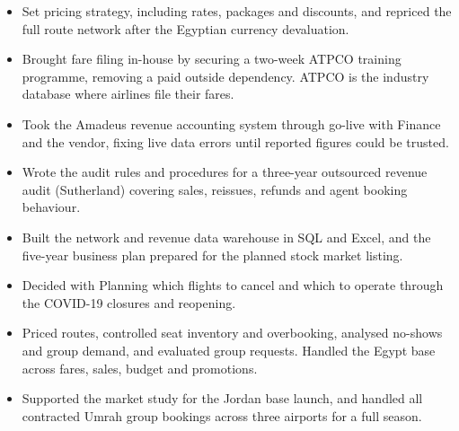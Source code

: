 \begin{itemize}
  \item Set pricing strategy, including rates, packages and discounts, and repriced the full route network after the Egyptian currency devaluation.
  \item Brought fare filing in-house by securing a two-week ATPCO training programme, removing a paid outside dependency. ATPCO is the industry database where airlines file their fares.
  \item Took the Amadeus revenue accounting system through go-live with Finance and the vendor, fixing live data errors until reported figures could be trusted.
  \item Wrote the audit rules and procedures for a three-year outsourced revenue audit (Sutherland) covering sales, reissues, refunds and agent booking behaviour.
  \item Built the network and revenue data warehouse in SQL and Excel, and the five-year business plan prepared for the planned stock market listing.
  \item Decided with Planning which flights to cancel and which to operate through the COVID-19 closures and reopening.
\end{itemize}

\begin{itemize}
  \item Priced routes, controlled seat inventory and overbooking, analysed no-shows and group demand, and evaluated group requests. Handled the Egypt base across fares, sales, budget and promotions.
  \item Supported the market study for the Jordan base launch, and handled all contracted Umrah group bookings across three airports for a full season.
\end{itemize}

